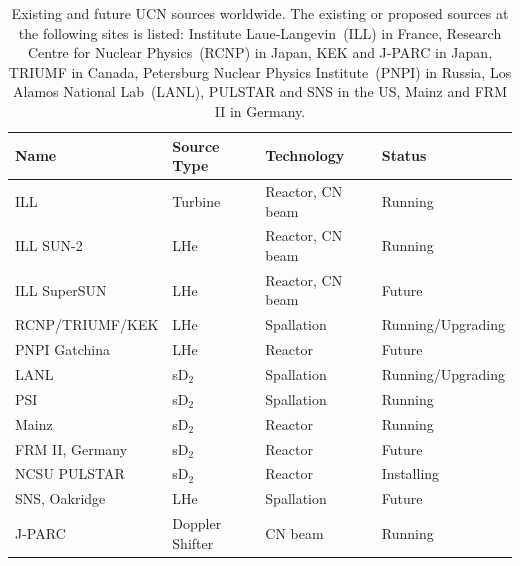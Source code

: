 \begin{table}[h!]
\begin{center}
\begin{tabular}{|l|l|l|l|}
\hline
Name & Source Type & Technology & Status \\
  \hline
  \hline
ILL  & Turbine & Reactor, CN beam & Running
\\
\hline
ILL SUN-2 & LHe & Reactor, CN beam & Running 
\\
\hline
ILL SuperSUN & LHe & Reactor, CN beam & Future
\\
\hline
RCNP/TRIUMF/KEK & LHe & Spallation & Running/Upgrading
\\
\hline
PNPI Gatchina & LHe & Reactor & Future
\\
\hline
LANL & sD$_2$ & Spallation & Running/Upgrading
\\
\hline
PSI & sD$_2$ & Spallation & Running
\\
\hline
Mainz & sD$_2$ & Reactor & Running
\\
\hline
FRM II, Germany & sD$_2$ & Reactor & Future
\\
\hline
NCSU PULSTAR & sD$_2$ & Reactor & Installing
  \\
  \hline
  SNS, Oakridge & LHe & Spallation & Future
  \\
  \hline
  J-PARC & Doppler Shifter & CN beam & Running
  \\
  \hline
\end{tabular}
\end{center}
\caption[UCN facilities worldwide]{Existing and future UCN sources
  worldwide. The existing or proposed sources at the following sites
  is listed: Institute Laue-Langevin~(ILL) in France, Research Centre
  for Nuclear Physics~(RCNP) in Japan, KEK and J-PARC in Japan, TRIUMF
  in Canada, Petersburg Nuclear Physics Institute~(PNPI) in Russia,
  Los Alamos National Lab~(LANL), PULSTAR and SNS in the US, Mainz and
  FRM II in Germany. }
\label{tab:full_ucn_sources}
\end{table}



